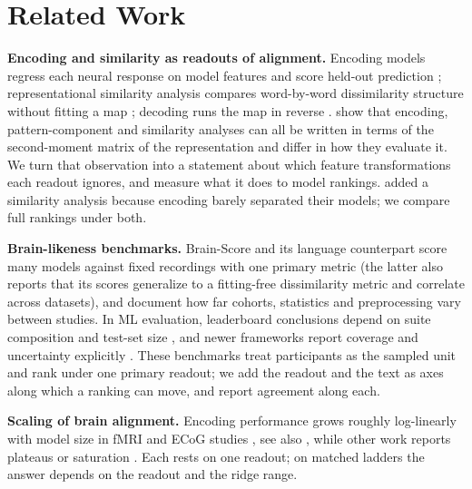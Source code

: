 \documentclass{article}
\begin{document}
\section{Related Work}\label{sec:related}

\textbf{Encoding and similarity as readouts of alignment.} Encoding models regress each neural response on model features and score held-out
prediction \citep{huth2016natural, toneva2019interpreting, schrimpf2021neural,
caucheteux2022brains, caucheteux2023evidence, goldstein2022shared}; representational similarity analysis compares
word-by-word dissimilarity structure without fitting a map \citep{kriegeskorte2008representational,
nili2014toolbox}; decoding runs the map in reverse \citep{tang2023semantic,
defossez2023decoding}. \citet{diedrichsen2017representational} show that encoding,
pattern-component and similarity analyses can all be written in terms of the second-moment matrix
of the representation and differ in how they evaluate it. We turn that observation into a statement about which
feature transformations each readout ignores, and measure what it does to model rankings.
\citet{ryskina2025language} added a similarity analysis because encoding barely separated their
models; we compare full rankings under both.

\textbf{Brain-likeness benchmarks.} Brain-Score \citep{schrimpf2020integrative} and its language
counterpart \citep{schrimpf2021neural} score many models against fixed recordings with one primary
metric (the latter also reports that its scores generalize to a fitting-free dissimilarity metric and
correlate across datasets), and \citet{oota2024survey} document how far cohorts, statistics and preprocessing vary
between studies. In ML evaluation, leaderboard conclusions depend on suite composition
\citep{dehghani2021benchmark} and test-set size \citep{card2020little}, and newer frameworks report
coverage and uncertainty explicitly \citep{liang2023holistic}. These benchmarks treat participants
as the sampled unit and rank under one primary readout; we add the readout and the text as axes along which a
ranking can move, and report agreement along each.

\textbf{Scaling of brain alignment.} Encoding performance grows roughly log-linearly with model
size in fMRI and ECoG studies \citep{antonello2024scaling, gao2024scaling, hong2026larger}, see
also \citet{nastase2025larger}, while other work reports plateaus or saturation
\citep{raugel2025scaling, oota2026linguistic}. Each rests on one readout; on matched ladders the
answer depends on the readout and the ridge range.
\end{document}
